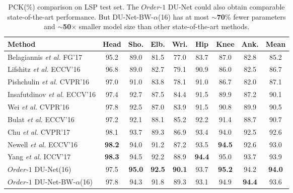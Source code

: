 \documentclass[runningheads]{llncs}
\begin{document}
\begin{table}[htb]
\begin{center}
\small
\caption{PCK(\%) comparison on LSP test set. The $Order$-$1$ DU-Net could also obtain comparable state-of-the-art performance. But DU-Net-BW-$\alpha$(16) has at most $\sim${\bf 70}\% fewer parameters and $\sim${\bf 50}$\times$ smaller model size than other state-of-the-art methods.}\label{tb:lsp}
\setlength\tabcolsep{1.5pt}
\begin{tabular}{@{}lcccccccc@{}}
\toprule
Method & Head & Sho. & Elb. & Wri. & Hip & Knee & Ank. & Mean\\
\hline
Belagiannis \textit{et al.} FG'17 \cite{belagiannis2017recurrent} & 95.2 & 89.0 & 81.5 & 77.0 & 83.7 & 87.0 & 82.8 & 85.2\\
Lifshitz \textit{et al.} ECCV'16 \cite{lifshitz2016human} & 96.8 & 89.0 & 82.7 & 79.1 & 90.9 & 86.0 & 82.5 & 86.7\\
Pishchulin \textit{et al.} CVPR'16 \cite{pishchulin2016deepcut} &  97.0 & 91.0 & 83.8 & 78.1 & 91.0 & 86.7 & 82.0 & 87.1\\
Insafutdinov \textit{et al.} ECCV'16 \cite{insafutdinov2016deepercut}& 97.4 & 92.7 & 87.5 & 84.4 & 91.5 & 89.9 & 87.2 & 90.1\\
Wei \textit{et al.} CVPR'16 \cite{wei2016convolutional}& 97.8 & 92.5 & 87.0 & 83.9 & 91.5 & 90.8 & 89.9 & 90.5\\
Bulat \textit{et al.} ECCV'16 \cite{bulat2016human}& 97.2 & 92.1 & 88.1 & 85.2 & 92.2 & 91.4 & 88.7 & 90.7\\
Chu \textit{et al.} CVPR'17 \cite{chu2017multi}& 98.1 & 93.7 & 89.3 & 86.9 &  93.4 & 94.0 & 92.5 & 92.6\\
Newell {\it et al.} ECCV'16 \cite{newell2016stacked} & {\bf 98.2} & 94.0 & 91.2 & 87.2 & 93.5 & {\bf 94.5} & 92.6 & 93.0\\
Yang \textit{et al.} ICCV'17 \cite{yang2017learning} & {\bf 98.3} & 94.5 & 92.2 & 88.9 & {\bf 94.4} & 95.0 & 93.7 & 93.9\\
\hline
$Order$-$1$ DU-Net(16) &  97.5 & {\bf 95.0} & {\bf 92.5} & {\bf 90.1} &  93.7 &  {\bf 95.2} & 94.2 & {\bf 94.0}\\
$Order$-$1$ DU-Net-BW-$\alpha$(16) &  97.8 & 94.3 & 91.8 & 89.3 &  93.1 &  94.9 & {\bf 94.4} & 93.6\\

\bottomrule
\end{tabular}
\end{center}
\end{table}
\end{document}
